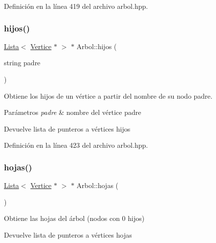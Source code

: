 Definición en la línea 419 del archivo arbol.\+hpp.

\mbox{\label{classArbol_ac799e737e25e07d285d2bb29ba950b5c}} 
\subsubsection{\texorpdfstring{hijos()}{hijos()}\hspace{0.1cm}{\footnotesize\ttfamily [2/2]}}
{\footnotesize\ttfamily \hyperlink{classLista}{Lista}$<$ \hyperlink{classVertice}{Vertice} $\ast$ $>$ $\ast$ Arbol\+::hijos (\begin{DoxyParamCaption}\item[{string}]{padre }\end{DoxyParamCaption})}



Obtiene los hijos de un vértice a partir del nombre de su nodo padre. 


\begin{DoxyParams}{Parámetros}
{\em padre} & nombre del vértice padre \\
\hline
\end{DoxyParams}
\begin{DoxyReturn}{Devuelve}
lista de punteros a vértices hijos 
\end{DoxyReturn}


Definición en la línea 423 del archivo arbol.\+hpp.

\mbox{\label{classArbol_a54203315682d5c39015ae7d871223b66}} 
\subsubsection{\texorpdfstring{hojas()}{hojas()}}
{\footnotesize\ttfamily \hyperlink{classLista}{Lista}$<$ \hyperlink{classVertice}{Vertice} $\ast$ $>$ $\ast$ Arbol\+::hojas (\begin{DoxyParamCaption}{ }\end{DoxyParamCaption})}



Obtiene las hojas del árbol (nodos con 0 hijos) 

\begin{DoxyReturn}{Devuelve}
lista de punteros a vértices hojas 
\end{DoxyReturn}


